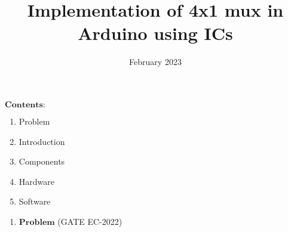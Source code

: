 \documentclass[12pt]{article}
\title{Implementation of 4x1 mux in Arduino using ICs}
\date{February 2023}
\begin{document}
\maketitle 
	$\textbf{Contents:}$
\begin{enumerate}
	\item Problem
	\item Introduction
	\item Components
	\item Hardware
	\item Software
\end{enumerate}
\begin{enumerate}
	\pagebreak \item $\textbf{Problem}$
		\newline(GATE EC-2022)\newline


\end{enumerate}
\end{document}
